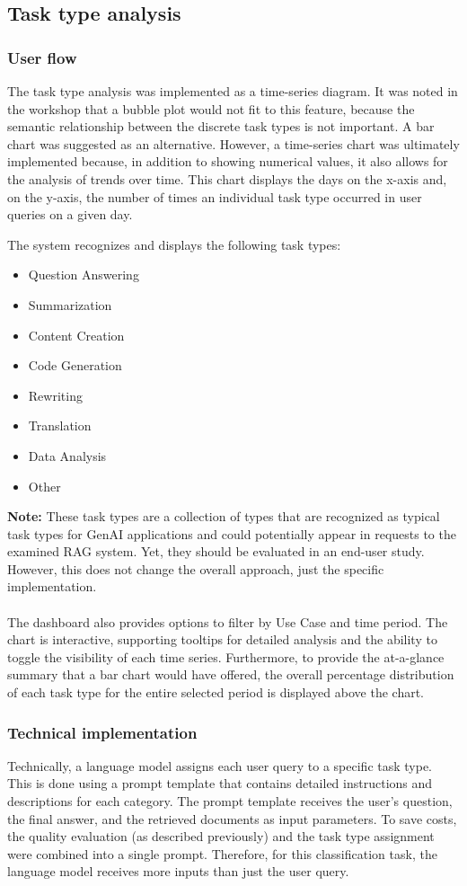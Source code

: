 \documentclass[
	english,
	ruledheaders=section,%
	class=report,%
	thesis={type=bachelor},%
	accentcolor=1b,%
	custommargins=true,%
	marginpar=false,%
	parskip=half-,%
	fontsize=11pt,%
	DIV=14,
]{tudapub}
\begin{document}
\subsection{Task type analysis}
\subsubsection{User flow}
The task type analysis was implemented as a time-series diagram. It was noted in the workshop that a bubble plot would not fit to this feature, because the semantic relationship between the discrete task types is not important. A bar chart was suggested as an alternative. However, a time-series chart was ultimately implemented because, in addition to showing numerical values, it also allows for the analysis of trends over time. This chart displays the days on the x-axis and, on the y-axis, the number of times an individual task type occurred in user queries on a given day.

The system recognizes and displays the following task types:
\begin{itemize}
    \item Question Answering
    \item Summarization
    \item Content Creation
    \item Code Generation
    \item Rewriting
    \item Translation
    \item Data Analysis
    \item Other
\end{itemize}
\textbf{Note:} These task types are a collection of types that are recognized as typical task types for GenAI applications and could potentially appear in requests to the examined RAG system. Yet, they should be evaluated in an end-user study. However, this does not change the overall approach, just the specific implementation.\\
\\
The dashboard also provides options to filter by Use Case and time period. The chart is interactive, supporting tooltips for detailed analysis and the ability to toggle the visibility of each time series. Furthermore, to provide the at-a-glance summary that a bar chart would have offered, the overall percentage distribution of each task type for the entire selected period is displayed above the chart.

\subsubsection{Technical implementation}
Technically, a language model assigns each user query to a specific task type. This is done using a prompt template that contains detailed instructions and descriptions for each category. The prompt template receives the user's question, the final answer, and the retrieved documents as input parameters. To save costs, the quality evaluation (as described previously) and the task type assignment were combined into a single prompt. Therefore, for this classification task, the language model receives more inputs than just the user query.
\end{document}

